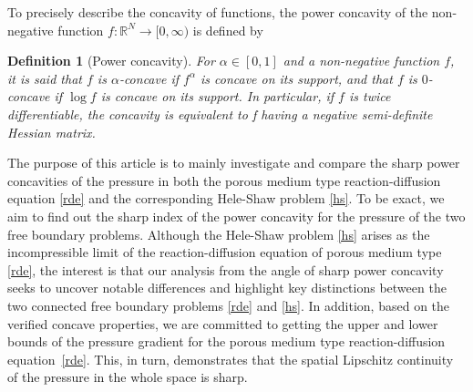 \documentclass[10pt]{article}         %
\newtheorem{definition}{Definition}[section]
\numberwithin{equation}{section}
\begin{document}
\vspace{2mm}

 To precisely describe the concavity of functions, the power concavity of the non-negative function $f:\mathbb{R}^N\to[0,\infty)$ is defined by
\begin{definition}[Power concavity]For $\alpha\in[0,1]$ and a non-negative function $f$, it is said that $f$ is $\alpha$-concave if $f^\alpha$ is concave on its support, and that $f$ is $0$-concave if $\log f$ is concave on its support. In particular, if $f$ is twice differentiable, the concavity is equivalent to f having a negative semi-definite Hessian matrix.
\end{definition}



\vspace{2mm}



The purpose of this article is to mainly investigate and compare the sharp power concavities of the pressure in both the porous medium type reaction-diffusion equation \eqref{rde} and the corresponding Hele-Shaw problem \eqref{hs}. To be exact, we aim to find out the sharp index of the power concavity for the pressure of the two free boundary problems. Although the Hele-Shaw problem \eqref{hs} arises as the incompressible limit of the reaction-diffusion equation of porous medium type \eqref{rde}, the interest is that our analysis from the angle of sharp power concavity seeks to uncover notable differences and highlight key distinctions between the two connected free boundary problems \eqref{rde} and \eqref{hs}. In addition, based on the verified concave properties, we are committed to getting the upper and lower bounds of the pressure gradient for the porous medium type reaction-diffusion equation~\eqref{rde}. This, in turn, demonstrates that the spatial Lipschitz continuity of the pressure in the whole space is sharp.

\vspace{2mm}
\end{document}
